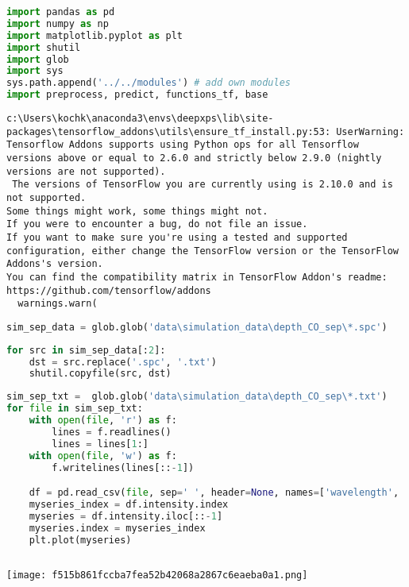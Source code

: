 \begin{lstlisting}[language=Python]
import pandas as pd
import numpy as np
import matplotlib.pyplot as plt
import shutil
import glob
import sys
sys.path.append('../../modules') # add own modules
import preprocess, predict, functions_tf, base
\end{lstlisting}

\begin{lstlisting}
c:\Users\kochk\anaconda3\envs\deepxps\lib\site-packages\tensorflow_addons\utils\ensure_tf_install.py:53: UserWarning: Tensorflow Addons supports using Python ops for all Tensorflow versions above or equal to 2.6.0 and strictly below 2.9.0 (nightly versions are not supported). 
 The versions of TensorFlow you are currently using is 2.10.0 and is not supported. 
Some things might work, some things might not.
If you were to encounter a bug, do not file an issue.
If you want to make sure you're using a tested and supported configuration, either change the TensorFlow version or the TensorFlow Addons's version. 
You can find the compatibility matrix in TensorFlow Addon's readme:
https://github.com/tensorflow/addons
  warnings.warn(
\end{lstlisting}

\begin{lstlisting}[language=Python]
sim_sep_data = glob.glob('data\simulation_data\depth_CO_sep\*.spc')
\end{lstlisting}

\begin{lstlisting}[language=Python]
for src in sim_sep_data[:2]:
    dst = src.replace('.spc', '.txt')
    shutil.copyfile(src, dst)
\end{lstlisting}

\begin{lstlisting}[language=Python]
sim_sep_txt =  glob.glob('data\simulation_data\depth_CO_sep\*.txt')
for file in sim_sep_txt:
    with open(file, 'r') as f:
        lines = f.readlines()
        lines = lines[1:]
    with open(file, 'w') as f:
        f.writelines(lines[::-1])

    df = pd.read_csv(file, sep=' ', header=None, names=['wavelength', 'intensity', ''])
    myseries_index = df.intensity.index
    myseries = df.intensity.iloc[::-1]
    myseries.index = myseries_index
    plt.plot(myseries)
    
\end{lstlisting}

\texttt{[image: f515b861fccba7fea52b42068a2867c6eaeba0a1.png]}

